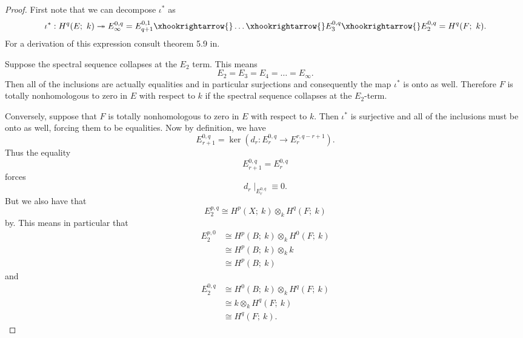 \documentclass[11pt]{amsart}
\begin{document}
\begin{proof}
    First note that we can decompose $\iota^*$ as 
    \begin{equation*}
        \iota^*: H^q(E;\ k) \twoheadrightarrow E^{0,q}_\infty = E^{0,1}_{q+1} \xhookrightarrow{} \dots \xhookrightarrow{} E_3^{0,q} \xhookrightarrow{} E^{0,q}_2 = H^q(F; \ k).
    \end{equation*}
    For a derivation of this expression consult theorem 5.9 in\cite{mccleary}. 
    
    Suppose the spectral sequence collapses at the $E_2$ term. This means 
    \begin{equation*}
        E_2 = E_3 = E_4 = \dots = E_\infty.
    \end{equation*}Then all of the inclusions are actually equalities and in particular surjections and consequently the map $\iota^*$ is onto as well. Therefore $F$ is totally nonhomologous to zero in $E$ with respect to $k$ if the spectral sequence collapses at the $E_2$-term.

    Conversely, suppose that $F$ is totally nonhomologous to zero in $E$ with respect to $k$. Then $\iota^*$ is surjective and all of the inclusions must be onto as well, forcing them to be equalities. Now by definition, we have 
    \begin{equation*}
        E_{r+1}^{0,q} = \ker\left(d_r: E_r^{0,q}\to E_r^{r, q-r+1}\right).
    \end{equation*}
     Thus the equality 
    \begin{equation*}
        E_{r+1}^{0,q} = E_{r}^{0,q}
    \end{equation*}
    forces 
    \begin{equation*}
        d_r \mid _{E_r^{0,q}} \equiv 0.
    \end{equation*}
   But we also have that
    \begin{equation}\label{superpower}
        E_2^{p,q}\cong H^p(X;\ k)\otimes_k H^q(F;\ k)
    \end{equation}
    by.
    This means in particular that
    \begin{equation}\label{oans}
        \begin{align*}
        E^{p,0}_2 &\cong H^p{(B;\ k)} \otimes_k H^0(F;\ k)\\
        & \cong H^p{(B;\ k)} \otimes_k k\\
        & \cong H^p{(B;\ k)}
    \end{align*}
    \end{equation} 
    and
    \begin{equation}\label{zwoa}
        \begin{align}
        E^{0,q}_2 &\cong H^0(B;\ k) \otimes_k H^q(F;\ k)\\
        & \cong k \otimes_k H^q(F; \ k)\\
        & \cong  H^q(F; \ k).
    \end{align}
    \end{equation}
    

\end{proof}
\end{document}
